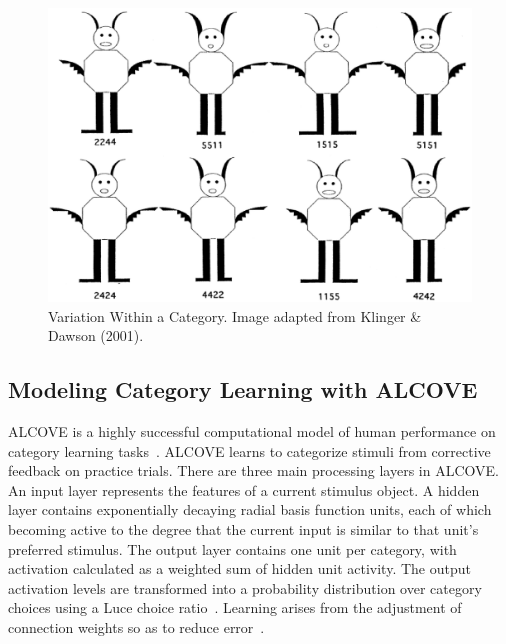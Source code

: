 \begin{figure}[ht]
\begin{center}
	\includegraphics[width=160mm]{figures/mip_familiarization.eps}
\end{center}
\caption{Variation Within a Category. Image adapted from Klinger \& Dawson (2001).}
\label{mip-familiarization}
\end{figure} 


\subsection{Modeling Category Learning with ALCOVE}
ALCOVE is a highly successful computational model of human performance on category learning tasks~\cite{KruschkeJK:1992:ALCOVE}. ALCOVE learns to categorize stimuli from corrective feedback on practice trials. There are three main processing layers in ALCOVE. An input layer represents the features of a current stimulus object. A hidden layer contains exponentially decaying radial basis function units, each of which becoming active to the degree that the current input is similar to that unit's preferred stimulus. The output layer contains one unit per category, with activation calculated as a weighted sum of hidden unit activity. The output activation levels are transformed into a probability distribution over category choices using a Luce choice ratio~\cite{LuceRD:1963:Ratio}. Learning arises from the adjustment of connection weights so as to reduce error~\cite{KruschkeJK:1992:ALCOVE}.

